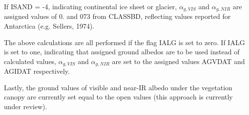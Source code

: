If I\+S\+A\+N\+D = -\/4, indicating continental ice sheet or glacier, $\alpha_{g,VIS}$ and $\alpha_{g,NIR}$ are assigned values of 0. and 073 from C\+L\+A\+S\+S\+B\+D, reflecting values reported for Antarctica (e.\+g. Sellers, 1974).

The above calculations are all performed if the flag I\+A\+L\+G is set to zero. If I\+A\+L\+G is set to one, indicating that assigned ground albedos are to be used instead of calculated values, $\alpha_{g,VIS}$ and $\alpha_{g,NIR}$ are set to the assigned values A\+G\+V\+D\+A\+T and A\+G\+I\+D\+A\+T respectively.

Lastly, the ground values of visible and near-\/\+I\+R albedo under the vegetation canopy are currently set equal to the open values (this approach is currently under review).